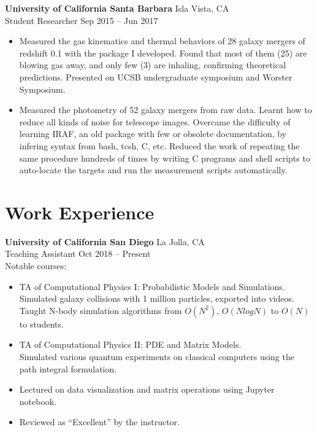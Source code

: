 \documentclass[letterpaper,12pt]{article}
\newenvironment{zitemize}{
\begin{itemize} \vspace{-.9em}\itemsep 0pt \parskip 0pt}
{\end{itemize}\vspace{-.5em}}
\begin{document}
\textbf{University of California Santa Barbara} \hfill Isla Vista, CA \\
Student Researcher \hfill Sep 2015 -- Jun 2017 \\
\begin{zitemize}
    \item Measured the gas kinematics and thermal behaviors of 28 galaxy mergers of redshift 0.1 with the package I developed. Found that most of them (25) are blowing gas away, and only few (3) are inhaling, confirming theoretical predictions. Presented on UCSB undergraduate symposium and Worster Symposium.
    \item Measured the photometry of 52 galaxy mergers from raw data. Learnt how to reduce all kinds of noise for telescope images. Overcame the difficulty of learning IRAF, an old package with few or obsolete documentation, by infering syntax from bash, tcsh, C, etc. Reduced the work of repeating the same procedure hundreds of times by writing C programs and shell scripts to auto-locate the targets and run the measurement scripts automatically.
\end{zitemize}



\section{Work Experience}

\textbf{University of California San Diego} \hfill La Jolla, CA \\
Teaching Assistant \hfill Oct 2018 -- Present \\
Notable courses:
\begin{zitemize}
    \item TA of Computational Physics I: Probabilistic Models and Simulations. \\
    Simulated galaxy collisions with 1 million particles, exported into videos. \\
    Taught N-body simulation algorithms from $O(N^2)$, $O(NlogN)$ to $O(N)$ to students.
    \item TA of Computational Physics II: PDE and Matrix Models. \\
    Simulated various quantum experiments on classical computers using the path integral formulation.
    \item Lectured on data visualization and matrix operations using Jupyter notebook.
    \item Reviewed as ``Excellent'' by the instructor.
\end{zitemize}
\end{document}
